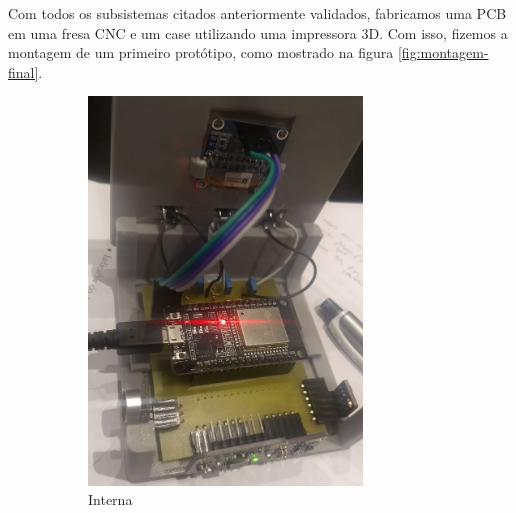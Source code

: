 \documentclass[../monografia.tex]{subfiles}
\begin{document}

Com todos os subsistemas citados anteriormente validados, fabricamos uma PCB em uma fresa CNC e um case utilizando uma impressora 3D. Com isso, fizemos a montagem de um primeiro protótipo, como mostrado na figura \ref{fig:montagem-final}. 

\begin{figure}[h]
	\centering
	\begin{subfigure}{0.5\textwidth}
		\centering
		\includegraphics[width=0.8\textwidth]{placa-final}
		\caption{Interna}
		\label{fig:interna}
	\end{subfigure}%
	\begin{subfigure}{0.5\textwidth}
		\centering

\end{subfigure}
\end{figure}
\end{document}
